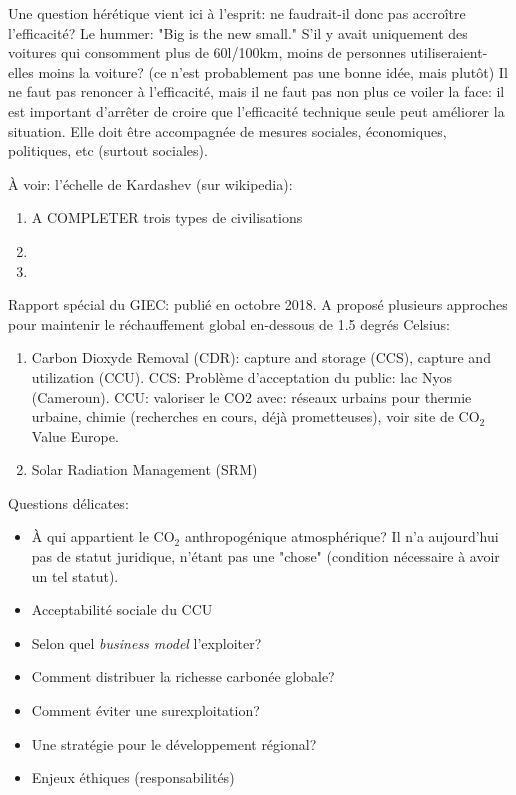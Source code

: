 \documentclass{article}
\begin{document}
 Une question hérétique vient ici à l'esprit: ne faudrait-il donc pas accroître l'efficacité? Le hummer: "Big is the new small." S'il y avait uniquement des voitures qui consomment plus de 60l/100km, moins de personnes utiliseraient-elles moins la voiture? (ce n'est probablement pas une bonne idée, mais plutôt)
 Il ne faut pas renoncer à l'efficacité, mais il ne faut pas non plus ce voiler la face: il est important d'arrêter de croire que l'efficacité technique seule peut améliorer la situation. Elle doit être accompagnée de mesures sociales, économiques, politiques, etc (surtout sociales). \par
 À voir: l'échelle de Kardashev (sur wikipedia):
 \begin{enumerate}
 	\item A COMPLETER trois types de civilisations
 	\item 
 	\item 
 \end{enumerate}
Rapport spécial du GIEC: publié en octobre 2018. A proposé plusieurs approches pour maintenir le réchauffement global en-dessous de 1.5 degrés Celsius:
\begin{enumerate}
	\item Carbon Dioxyde Removal (CDR): capture and storage (CCS), capture and utilization (CCU). CCS: Problème d'acceptation du public: lac Nyos (Cameroun). CCU: valoriser le CO2 avec: réseaux urbains pour thermie urbaine, chimie (recherches en cours, déjà prometteuses), voir site de CO$_2$ Value Europe.
	\item Solar Radiation Management (SRM)
\end{enumerate}

Questions délicates:
\begin{itemize}
	\item À qui appartient le CO$_2$ anthropogénique atmosphérique? Il n'a aujourd'hui pas de statut juridique, n'étant pas une "chose" (condition nécessaire à avoir un tel statut).
	\item Acceptabilité sociale du CCU
	\item Selon quel \emph{business model} l'exploiter?
	\item Comment distribuer la richesse carbonée globale?
	\item Comment éviter une surexploitation?
	\item Une stratégie pour le développement régional?
	\item Enjeux éthiques (responsabilités)
\end{itemize}
\end{document}

